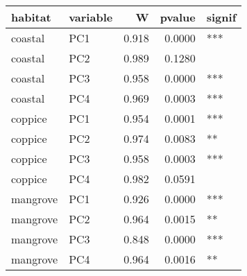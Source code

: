 
\begin{tabular}{llrrl}
\toprule
habitat & variable & W & pvalue & signif\\
\midrule
coastal & PC1 & 0.918 & 0.0000 & ***\\
coastal & PC2 & 0.989 & 0.1280 & \\
coastal & PC3 & 0.958 & 0.0000 & ***\\
coastal & PC4 & 0.969 & 0.0003 & ***\\
coppice & PC1 & 0.954 & 0.0001 & ***\\
\addlinespace
coppice & PC2 & 0.974 & 0.0083 & **\\
coppice & PC3 & 0.958 & 0.0003 & ***\\
coppice & PC4 & 0.982 & 0.0591 & \\
mangrove & PC1 & 0.926 & 0.0000 & ***\\
mangrove & PC2 & 0.964 & 0.0015 & **\\
\addlinespace
mangrove & PC3 & 0.848 & 0.0000 & ***\\
mangrove & PC4 & 0.964 & 0.0016 & **\\
\bottomrule
\end{tabular}
